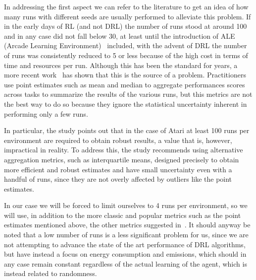 In addressing the first aspect we can refer to the literature to get an idea of how many runs with different seeds are usually performed to alleviate this problem. If in the early days of RL (and not DRL) the number of runs stood at around 100 and in any case did not fall below 30, at least until the introduction of ALE (Arcade Learning Environment)~\cite{bellemare:ale} included, with the advent of DRL the number of runs was consistently reduced to 5 or less because of the high cost in terms of time and resources per run. Although this has been the standard for years, a more recent work~\cite{agarwal:statistical_precipice} has shown that this is the source of a problem. Practitioners use point estimates such as mean and median to aggregate performances  scores across tasks to summarize the results of the various runs, but this metrics are not the best way to do so because they ignore the statistical uncertainty inherent in performing only a few runs.

In particular, the study points out that in the case of Atari at least 100 runs per environment are required to obtain robust results, a value that is, however, impractical in reality. To address this, the study recommends using alternative aggregation metrics, such as interquartile means, designed precisely to obtain more efficient and robust estimates and have small uncertainty even with a handful of runs, since they are not overly affected by outliers like the point estimates.

In our case we will be forced to limit ourselves to 4 runs per environment, so we will use, in addition to the more classic and popular metrics such as the point estimates mentioned above, the other metrics suggested in~\cite{agarwal:statistical_precipice}.  It should anyway be noted that a low number of runs is a less significant problem for us, since we are not attempting to advance the state of the art performance of DRL algorithms, but have instead a focus on energy consumption and emissions, which should in any case remain constant regardless of the actual learning of the agent, which is instead related to randomness.

